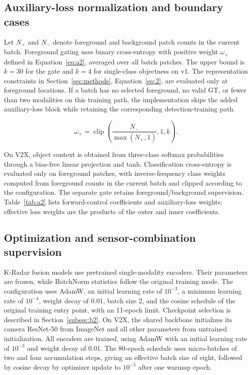 \subsection{Auxiliary-loss normalization and boundary cases}
\label{subsec:a2}

Let \(N_+\) and \(N_-\) denote foreground and background patch counts in the current batch. Foreground gating uses binary cross-entropy with positive weight \(\omega_+\) defined in Equation~\eqref{eq:a2}, averaged over all batch patches. The upper bound is \(k=30\) for the gate and \(k=4\) for single-class objectness on v1. The representation constraints in Section~\ref{sec:methods}, Equation~\eqref{eq:2}, are evaluated only at foreground locations. If a batch has no selected foreground, no valid GT, or fewer than two modalities on this training path, the implementation skips the added auxiliary-loss block while retaining the corresponding detection-training path.

\begin{equation}
\omega_+=\operatorname{clip}\!\left(\frac{N_-}{\max(N_+,1)},1,k\right).
\label{eq:a2}
\end{equation}

On V2X, object context is obtained from three-class softmax probabilities through a bias-free linear projection and tanh. Classification cross-entropy is evaluated only on foreground patches, with inverse-frequency class weights computed from foreground counts in the current batch and clipped according to the configuration. The separate gate retains foreground/background supervision. Table~\ref{tab:a2} lists forward-control coefficients and auxiliary-loss weights; effective loss weights are the products of the outer and inner coefficients.

\subsection{Optimization and sensor-combination supervision}
\label{subsec:a3}

K-Radar fusion models use pretrained single-modality encoders. Their parameters are frozen, while BatchNorm statistics follow the original training mode. The configuration uses AdamW, an initial learning rate of \(10^{-3}\), a minimum learning rate of \(10^{-4}\), weight decay of 0.01, batch size 2, and the cosine schedule of the original training entry point, with an 11-epoch limit. Checkpoint selection is described in Section~\ref{subsec:b2}. On V2X, the shared backbone initializes its camera ResNet-50 \citep{he2016resnet} from ImageNet and all other parameters from untrained initialization. All encoders are trained, using AdamW with an initial learning rate of \(10^{-3}\) and weight decay of 0.01. The 80-epoch schedule uses micro-batches of two and four accumulation steps, giving an effective batch size of eight, followed by cosine decay by optimizer update to \(10^{-5}\) after one warmup epoch.

